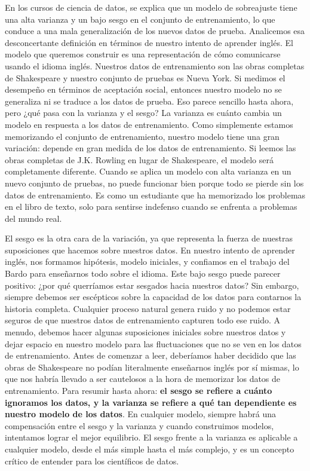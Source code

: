 En los cursos de ciencia de datos, se explica que un modelo de sobreajuste tiene una alta varianza y un bajo sesgo en el conjunto de entrenamiento, lo que conduce a una mala generalización de los nuevos datos de prueba. Analicemos esa desconcertante definición en términos de nuestro intento de aprender inglés. El modelo que queremos construir es una representación de cómo comunicarse usando el idioma inglés. Nuestros datos de entrenamiento son las obras completas de Shakespeare y nuestro conjunto de pruebas es Nueva York. Si medimos el desempeño en términos de aceptación social, entonces nuestro modelo no se generaliza ni se traduce a los datos de prueba. Eso parece sencillo hasta ahora, pero ¿qué pasa con la varianza y el sesgo?
La varianza es cuánto cambia un modelo en respuesta a los datos de entrenamiento. Como simplemente estamos memorizando el conjunto de entrenamiento, nuestro modelo tiene una gran variación: depende en gran medida de los datos de entrenamiento. Si leemos las obras completas de J.K. Rowling en lugar de Shakespeare, el modelo será completamente diferente. Cuando se aplica un modelo con alta varianza en un nuevo conjunto de pruebas, no puede funcionar bien porque todo se pierde sin los datos de entrenamiento. Es como un estudiante que ha memorizado los problemas en el libro de texto, solo para sentirse indefenso cuando se enfrenta a problemas del mundo real.

El sesgo es la otra cara de la variación, ya que representa la fuerza de nuestras suposiciones que hacemos sobre nuestros datos. En nuestro intento de aprender inglés, nos formamos hipótesis, modelo iniciales, y confiamos en el trabajo del Bardo para enseñarnos todo sobre el idioma. Este bajo sesgo puede parecer positivo: ¿por qué querríamos estar sesgados hacia nuestros datos? Sin embargo, siempre debemos ser escépticos sobre la capacidad de los datos para contarnos la historia completa. Cualquier proceso natural genera ruido y no podemos estar seguros de que nuestros datos de entrenamiento capturen todo ese ruido. A menudo, debemos hacer algunas suposiciones iniciales sobre nuestros datos y dejar espacio en nuestro modelo para las fluctuaciones que no se ven en los datos de entrenamiento. Antes de comenzar a leer, deberíamos haber decidido que las obras de Shakespeare no podían literalmente enseñarnos inglés por sí mismas, lo que nos habría llevado a ser cautelosos a la hora de memorizar los datos de entrenamiento.
Para resumir hasta ahora: \textbf{el sesgo se refiere a cuánto ignoramos los datos, y la varianza se refiere a qué tan dependiente es nuestro modelo de los datos}. En cualquier modelo, siempre habrá una compensación entre el sesgo y la varianza y cuando construimos modelos, intentamos lograr el mejor equilibrio. El sesgo frente a la varianza es aplicable a cualquier modelo, desde el más simple hasta el más complejo, y es un concepto crítico de entender para los científicos de datos.

